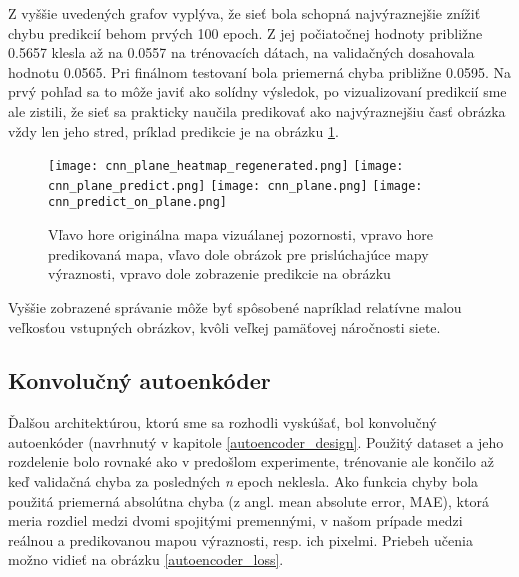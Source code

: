 Z vyššie uvedených grafov vyplýva, že sieť bola schopná najvýraznejšie znížiť chybu predikcií behom prvých 100 epoch. Z jej počiatočnej hodnoty približne 0.5657 klesla až na 0.0557 na trénovacích dátach, na validačných dosahovala hodnotu 0.0565. Pri finálnom testovaní bola priemerná chyba približne 0.0595. Na prvý pohľad sa to môže javiť ako solídny výsledok, po vizualizovaní predikcií sme ale zistili, že sieť sa prakticky naučila predikovať ako najvýraznejšiu časť obrázka vždy len jeho stred, príklad predikcie je na obrázku \ref{cnn_results}.

\begin{figure}[H]
	\begin{center}
		
		\texttt{[image: cnn\_plane\_heatmap\_regenerated.png]}
		\texttt{[image: cnn\_plane\_predict.png]}
		\texttt{[image: cnn\_plane.png]}
		\texttt{[image: cnn\_predict\_on\_plane.png]}
		\caption[Vzorka predikcie konvolučnej neurónovej siete]{
			Vľavo hore originálna mapa vizuálanej pozornosti, vpravo hore predikovaná mapa, vľavo dole obrázok pre prislúchajúce mapy výraznosti, vpravo dole zobrazenie predikcie na obrázku
		}\label{cnn_results}
	\end{center}
\end{figure}

Vyššie zobrazené správanie môže byť spôsobené napríklad relatívne malou veľkosťou vstupných obrázkov, kvôli veľkej pamäťovej náročnosti siete. 

\subsection{Konvolučný autoenkóder}
\label{experiments_autoencoder}

Ďalšou architektúrou, ktorú sme sa rozhodli vyskúšať, bol konvolučný autoenkóder (navrhnutý v kapitole \ref{autoencoder_design}. Použitý dataset a jeho rozdelenie bolo rovnaké ako v predošlom experimente, trénovanie ale končilo až keď validačná chyba za posledných \textit{n} epoch neklesla. Ako funkcia chyby bola použitá priemerná absolútna chyba (z angl. mean absolute error, MAE), ktorá meria rozdiel medzi dvomi spojitými premennými, v našom prípade medzi reálnou a predikovanou mapou výraznosti, resp. ich pixelmi. Priebeh učenia možno vidieť na obrázku \ref{autoencoder_loss}. 


